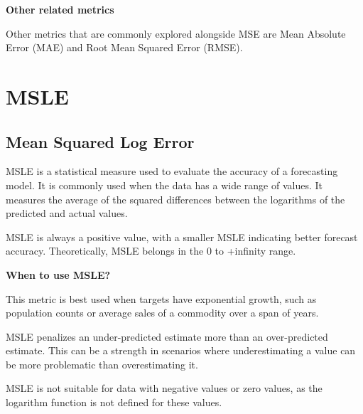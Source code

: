 \textbf{Other related metrics}

Other metrics that are commonly explored alongside MSE are Mean Absolute Error (MAE) and Root Mean Squared Error (RMSE).

\clearpage
\thispagestyle{regressionstyle}
\section{MSLE}
\subsection{Mean Squared Log Error}

MSLE is a statistical measure used to evaluate the accuracy of a forecasting model.
It is commonly used when the data has a wide range of values.
It measures the average of the squared differences between the logarithms of the predicted and actual values.

\begin{center}
\end{center}

MSLE is always a positive value, with a smaller MSLE indicating better forecast accuracy. Theoretically, MSLE belongs in the 0 to +infinity range.

\textbf{When to use MSLE?}

This metric is best used when targets have exponential growth, such as population counts or average sales of a commodity over a span of years.

{
    \item MSLE penalizes an under-predicted estimate more than an over-predicted estimate. This can be a strength in scenarios where underestimating a value can be more problematic than overestimating it.
    \item MSLE is not suitable for data with negative values or zero values, as the logarithm function is not defined for these values.
}

